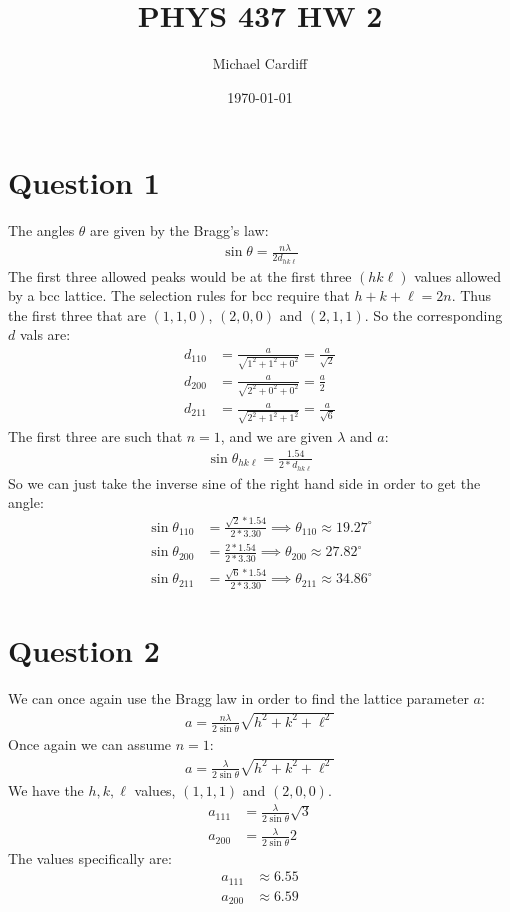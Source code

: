 \documentclass[12pt]{article}
\title{\vspace{-3em}PHYS 437 HW 2}
\author{Michael Cardiff}
\date{\today}
\begin{document}
\maketitle
\section*{Question 1}
The angles $\theta$ are given by the Bragg's law:
\begin{align*}
  \sin\theta=\frac{n\lambda}{2d_{hk\ell}}
\end{align*}
The first three allowed peaks would be at the first three $(hk\ell)$ values allowed by a bcc lattice. The selection rules for bcc require that $h+k+\ell=2n$. Thus the first three that are $(1,1,0)$, $(2,0,0)$ and $(2,1,1)$. So the corresponding $d$ vals are:
\begin{align*}
  d_{110}&=\frac{a}{\sqrt{1^2+1^2+0^2}}=\frac{a}{\sqrt{2}}\\
  d_{200}&=\frac{a}{\sqrt{2^2+0^2+0^2}}=\frac{a}{2}\\
  d_{211}&=\frac{a}{\sqrt{2^2+1^2+1^2}}=\frac{a}{\sqrt{6}}
\end{align*}
The first three are such that $n=1$, and we are given $\lambda$ and $a$:
\begin{align*}
  \sin\theta_{hk\ell}=\frac{1.54}{2*d_{hk\ell}}
\end{align*}
So we can just take the inverse sine of the right hand side in order to get the angle:
\begin{align*}
  \sin\theta_{110}&=\frac{\sqrt{2}*1.54}{2*3.30}
  \implies\theta_{110}\approx\boxed{19.27^\circ}\\
  \sin\theta_{200}&=\frac{2*1.54}{2*3.30}
  \implies\theta_{200}\approx\boxed{27.82^\circ}\\
  \sin\theta_{211}&=\frac{\sqrt{6}*1.54}{2*3.30}
  \implies\theta_{211}\approx\boxed{34.86^\circ}
\end{align*}
\section*{Question 2}
We can once again use the Bragg law in order to find the lattice parameter $a$:
\begin{align*}
  a=\frac{n\lambda}{2\sin\theta}\sqrt{h^2+k^2+\ell^2}
\end{align*}
Once again we can assume $n=1$:
\begin{align*}
  a=\frac{\lambda}{2\sin\theta}\sqrt{h^2+k^2+\ell^2}
\end{align*}
We have the $h,k,\ell$ values, $(1,1,1)$ and $(2,0,0)$.
\begin{align*}
  a_{111}&=\frac{\lambda}{2\sin\theta}\sqrt{3}\\
  a_{200}&=\frac{\lambda}{2\sin\theta}2
\end{align*}
The values specifically are:
\begin{align*}
  a_{111}&\approx\boxed{6.55}\\
  a_{200}&\approx\boxed{6.59}
\end{align*}
\end{document}
